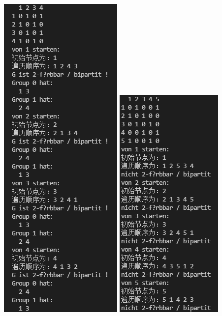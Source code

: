 \documentclass[a4paper]{article}    %
\begin{document}
\begin{center}
    \includegraphics[scale=0.6]{14.png}
    \includegraphics[scale=0.6]{15.png}
\end{center}
\end{document}
